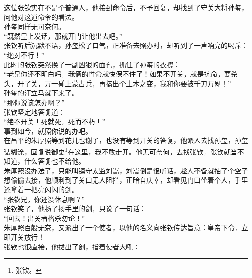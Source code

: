 \begin{multicols}{\theparacolNo}
这位张钦实在不是个普通人，他接到命令后，不予回复，却找到了守关大将孙玺，问他对这道命令的看法。\\

孙玺同样无可奈何。\\

“既然皇上发话，那就开门让他出去吧。”\\

张钦听后沉默不语，孙玺松了口气，正准备去照办时，却听到了一声响亮的喝斥：\\

“绝对不行！”\\

此时的张钦突然换了一副凶狠的面孔，抓住了孙玺的衣襟：\\

“老兄你还不明白吗，我俩的性命就快保不住了！如果不开关，就是抗命，要杀头，开了关，万一碰上蒙古兵，再搞出个土木之变，我和你要被千刀万剐！”\\

孙玺的汗立马就下来了。\\

“那你说该怎办啊？”\\

张钦坚定地答复道：\\

“绝不开关！死就死，死而不朽！”\\

事到如今，就照你说的办吧。\\

在昌平的朱厚照等到花儿也谢了，也没有等到开关的答复，他派人去找孙玺，孙玺装糊涂，回复说御史\footnote{张钦。}在这里，我不敢走开。他无可奈何，去找张钦，张钦就当不知道，什么答复也不给他。\\

朱厚照没办法了，只能叫镇守太监刘嵩，刘嵩倒是很听话，趁人不备就抽了个空子想偷偷去接，他顺利到了关口无人阻拦，正暗自庆幸，却看见门口坐着个人，手里还拿着一把亮闪闪的剑。\\

“张钦兄，你还没休息啊？”\\

张钦笑了，他扬了扬手里的剑，只说了一句话：\\

“回去！出关者格杀勿论！”\\

朱厚照百般无奈，又派出了一个使者，以他的名义向张钦传达旨意：皇帝下令，立即开关放行！\\

张钦也很直接，他拔出了剑，指着使者大吼：\\


\end{multicols}
